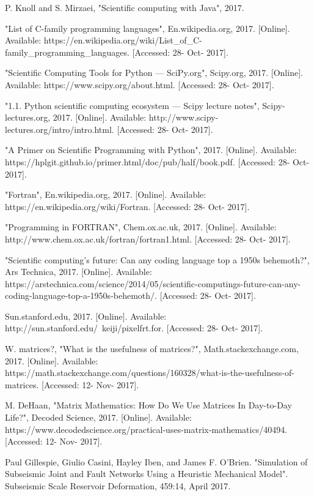 \documentclass[conference]{IEEEtran}
\begin{document}
\begin{thebibliography}{00}
 P. Knoll and S. Mirzaei, "Scientific computing with Java", 2017.

 "List of C-family programming languages", En.wikipedia.org, 2017. [Online]. Available: https://en.wikipedia.org/wiki/List\_of\_C-family\_programming\_languages. [Accessed: 28- Oct- 2017].

 "Scientific Computing Tools for Python — SciPy.org", Scipy.org, 2017. [Online]. Available: https://www.scipy.org/about.html. [Accessed: 28- Oct- 2017].

 "1.1. Python scientific computing ecosystem — Scipy lecture notes", Scipy-lectures.org, 2017. [Online]. Available: http://www.scipy-lectures.org/intro/intro.html. [Accessed: 28- Oct- 2017].

 "A Primer on Scientific Programming with Python", 2017. [Online]. Available: https://hplgit.github.io/primer.html/doc/pub/half/book.pdf. [Accessed: 28- Oct- 2017].

 "Fortran", En.wikipedia.org, 2017. [Online]. Available: https://en.wikipedia.org/wiki/Fortran. [Accessed: 28- Oct- 2017].

 "Programming in FORTRAN", Chem.ox.ac.uk, 2017. [Online]. Available: http://www.chem.ox.ac.uk/fortran/fortran1.html. [Accessed: 28- Oct- 2017].

 "Scientific computing’s future: Can any coding language top a 1950s behemoth?", Ars Technica, 2017. [Online]. Available: https://arstechnica.com/science/2014/05/scientific-computings-future-can-any-coding-language-top-a-1950s-behemoth/. [Accessed: 28- Oct- 2017].

 Sun.stanford.edu, 2017. [Online]. Available: http://sun.stanford.edu/~keiji/pixelfrt.for. [Accessed: 28- Oct- 2017].

 W. matrices?, "What is the usefulness of matrices?", Math.stackexchange.com, 2017. [Online]. Available: https://math.stackexchange.com/questions/160328/what-is-the-usefulness-of-matrices. [Accessed: 12- Nov- 2017].

 M. DeHaan, "Matrix Mathematics: How Do We Use Matrices In Day-to-Day Life?", Decoded Science, 2017. [Online]. Available: https://www.decodedscience.org/practical-uses-matrix-mathematics/40494. [Accessed: 12- Nov- 2017].

 Paul Gillespie, Giulio Casini, Hayley Iben, and James F. O'Brien. "Simulation of Subseismic Joint and Fault Networks Using a Heuristic Mechanical Model". Subseismic Scale Reservoir Deformation, 459:14, April 2017.


\end{thebibliography}
\end{document}
